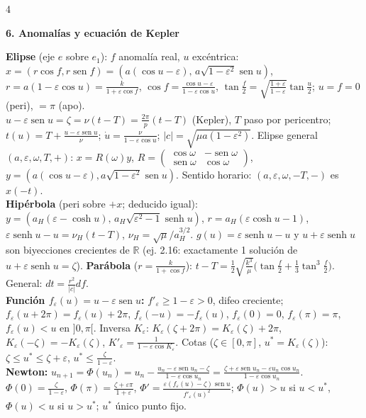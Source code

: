 \documentclass[8pt,a4paper,landscape]{extarticle}
\newcommand{\ab}[1]{\lvert #1\rvert}
\newcommand{\R}{\mathbb{R}}
\DeclareMathOperator{\sen}{sen}
\DeclareMathOperator{\senh}{senh}
\newcommand{\seccion}[1]{\par\vspace{1.5pt}\noindent\colorbox{blue!12}{\parbox{\dimexpr\linewidth-2\fboxsep\relax}{\textbf{\textcolor{NavyBlue}{#1}}}}\par\vspace{0.5pt}}
\begin{document}
\begin{multicols}{4}
\seccion{6. Anomalías y ecuación de Kepler}
\textbf{Elipse} (eje $e$ sobre $e_1$): $f$ anomalía real, $u$ excéntrica:
$x=(r\cos f,r\sen f)=(a(\cos u-\varepsilon),\,a\sqrt{1-\varepsilon^2}\sen u)$, $r=a(1-\varepsilon\cos u)=\frac{k}{1+\varepsilon\cos f}$,
$\cos f=\frac{\cos u-\varepsilon}{1-\varepsilon\cos u}$, $\tan\frac f2=\sqrt{\frac{1+\varepsilon}{1-\varepsilon}}\tan\frac u2$; $u=f=0$ (peri), $=\pi$ (apo).\\
$\boxed{u-\varepsilon\sen u=\zeta=\nu(t-T)=\frac{2\pi}p(t-T)}$ (Kepler), $T$ paso por pericentro; $t(u)=T+\frac{u-\varepsilon\sen u}{\nu}$; $\dot u=\frac{\nu}{1-\varepsilon\cos u}$; $\ab c=\sqrt{\mu a(1-\varepsilon^2)}$.
Elipse general $(a,\varepsilon,\omega,T,+)$: $x=R(\omega)y$, $R=\left(\begin{smallmatrix}\cos\omega&-\sen\omega\\\sen\omega&\cos\omega\end{smallmatrix}\right)$, $y=(a(\cos u-\varepsilon),a\sqrt{1-\varepsilon^2}\sen u)$. Sentido horario: $(a,\varepsilon,\omega,-T,-)$ es $x(-t)$.\\
\textbf{Hipérbola} (peri sobre $+x$; deducido igual): $y=(a_H(\varepsilon-\cosh u),\,a_H\sqrt{\varepsilon^2-1}\senh u)$, $r=a_H(\varepsilon\cosh u-1)$, $\boxed{\varepsilon\senh u-u=\nu_H(t-T)}$, $\nu_H=\sqrt\mu/a_H^{3/2}$. $g(u)=\varepsilon\senh u-u$ y $u+\varepsilon\senh u$ son biyecciones crecientes de $\R$ (ej. 2.16: exactamente 1 solución de $u+\varepsilon\senh u=\zeta$).
\textbf{Parábola} ($r=\frac k{1+\cos f}$): $t-T=\frac12\sqrt{\frac{k^3}{\mu}}\big(\tan\frac f2+\frac13\tan^3\frac f2\big)$. General: $dt=\frac{r^2}{\ab c}df$.\\
\textbf{Función $f_\varepsilon(u)=u-\varepsilon\sen u$:} $f'_\varepsilon\ge1-\varepsilon>0$, difeo creciente; $f_\varepsilon(u+2\pi)=f_\varepsilon(u)+2\pi$, $f_\varepsilon(-u)=-f_\varepsilon(u)$, $f_\varepsilon(0)=0$, $f_\varepsilon(\pi)=\pi$, $f_\varepsilon(u)<u$ en $]0,\pi[$. Inversa $K_\varepsilon$: $K_\varepsilon(\zeta+2\pi)=K_\varepsilon(\zeta)+2\pi$, $K_\varepsilon(-\zeta)=-K_\varepsilon(\zeta)$, $K'_\varepsilon=\frac1{1-\varepsilon\cos K_\varepsilon}$. Cotas ($\zeta\in[0,\pi]$, $u^*=K_\varepsilon(\zeta)$): $\zeta\le u^*\le\zeta+\varepsilon$, $u^*\le\frac\zeta{1-\varepsilon}$.\\
\textbf{Newton:} $u_{n+1}=\Phi(u_n)=u_n-\frac{u_n-\varepsilon\sen u_n-\zeta}{1-\varepsilon\cos u_n}=\frac{\zeta+\varepsilon\sen u_n-\varepsilon u_n\cos u_n}{1-\varepsilon\cos u_n}$.
$\Phi(0)=\frac\zeta{1-\varepsilon}$, $\Phi(\pi)=\frac{\zeta+\varepsilon\pi}{1+\varepsilon}$, $\Phi'=\frac{\varepsilon(f_\varepsilon(u)-\zeta)\sen u}{f'_\varepsilon(u)^2}$; $\Phi(u)>u$ si $u<u^*$, $\Phi(u)<u$ si $u>u^*$; $u^*$ único punto fijo.

\end{multicols}
\end{document}
